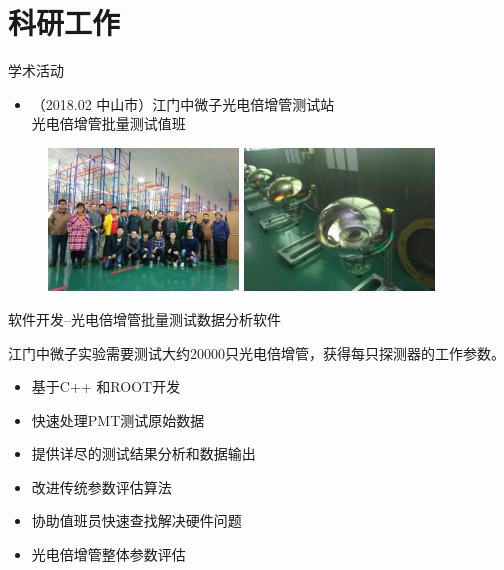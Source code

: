\documentclass[11pt,compress,xcolor=x11names,UTF8]{beamer}
\begin{document}
\section{科研工作}
\begin{frame}{学术活动}
\begin{itemize}
\item （2018.02 中山市）江门中微子光电倍增管测试站\\
	\alert{光电倍增管批量测试值班}
\end{itemize}
\begin{figure}
\centering
\includegraphics[width=0.451\textwidth]{pmttest} %
\includegraphics[width=0.451\textwidth]{pmts} %
\end{figure}
\end{frame}
\begin{frame}{软件开发--光电倍增管批量测试数据分析软件}

江门中微子实验需要测试大约20000只光电倍增管，获得每只探测器的工作参数。
\vspace{.6cm}
\hline

\begin{itemize}
\item 基于C++ 和ROOT开发
\item 快速处理PMT测试原始数据
\item 提供详尽的测试结果分析和数据输出
\item 改进传统参数评估算法
\item 协助值班员快速查找解决硬件问题
\item 光电倍增管整体参数评估
\end{itemize}

\hline

\end{frame}
\end{document}
